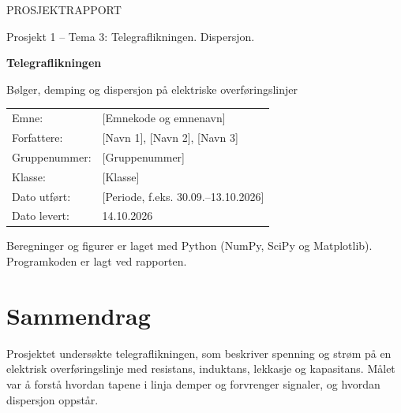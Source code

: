 \documentclass[11pt,a4paper]{article}
\newcommand{\Emne}{[Emnekode og emnenavn]}
\newcommand{\Forfattere}{[Navn 1], [Navn 2], [Navn 3]}
\newcommand{\Gruppe}{[Gruppenummer]}
\newcommand{\Klasse}{[Klasse]}
\newcommand{\DatoUtfort}{[Periode, f.eks. 30.09.--13.10.2026]}
\newcommand{\DatoLevert}{14.10.2026}
\numberwithin{equation}{section}
\numberwithin{figure}{section}
\numberwithin{table}{section}
\begin{document}
\begin{titlepage}
  \centering
  \vspace*{2.5cm}
  {\large PROSJEKTRAPPORT\par}
  \vspace{0.4cm}
  {\large Prosjekt 1 \quad -- \quad Tema 3: Telegraflikningen. Dispersjon.\par}
  \vspace{1.6cm}
  {\LARGE\bfseries Telegraflikningen\par}
  \vspace{0.4cm}
  {\Large Bølger, demping og dispersjon på elektriske overføringslinjer\par}
  \vspace{2.2cm}
  \begin{tabular}{>{\raggedleft\arraybackslash}p{4.2cm} p{8.5cm}}
    Emne:          & \Emne \\[3pt]
    Forfattere:    & \Forfattere \\[3pt]
    Gruppenummer:  & \Gruppe \\[3pt]
    Klasse:        & \Klasse \\[3pt]
    Dato utført:   & \DatoUtfort \\[3pt]
    Dato levert:   & \DatoLevert \\
  \end{tabular}
  \vfill
  {\small Beregninger og figurer er laget med Python (NumPy, SciPy og Matplotlib).\\
  Programkoden er lagt ved rapporten.\par}
\end{titlepage}

\setcounter{page}{1}
\thispagestyle{plain}
\section*{Sammendrag}

Prosjektet undersøkte telegraflikningen, som beskriver spenning og strøm på en
elektrisk overføringslinje med resistans, induktans, lekkasje og kapasitans. Målet
var å forstå hvordan tapene i linja demper og forvrenger signaler, og hvordan
dispersjon oppstår.
\end{document}
